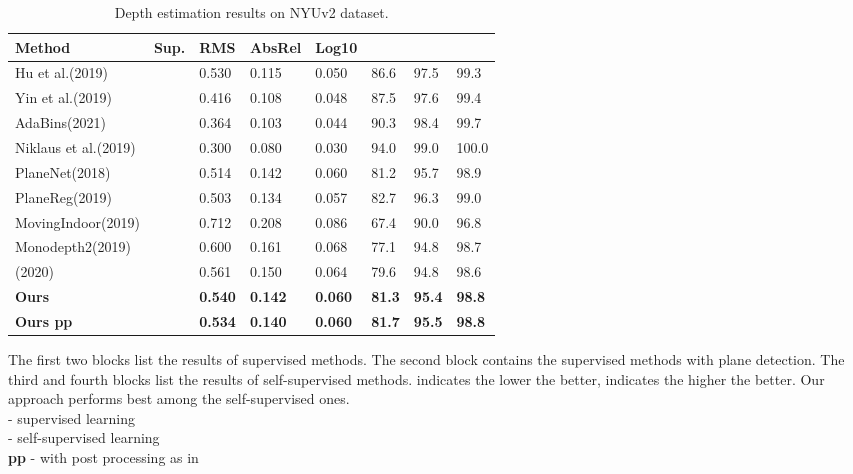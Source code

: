 \documentclass[10pt,twocolumn,letterpaper]{article}
\begin{document}
\begin{table*}[ht]
	\centering
	\begin{varwidth}[t]{\textwidth}
\vspace{0pt}
		\small
		\begin{tabularx}{0.67\textwidth}{|l|c|XXX|XXX|}
			\hline
			Method & Sup. & RMS & AbsRel & Log10 &  &  &  \\
			\hline
Hu et al.(2019)\cite{hu2019revisiting} &      & 0.530  & 0.115 & 0.050  & 86.6  & 97.5  & 99.3 \\
			Yin et al.(2019)\cite{yin2019enforcing}&      & 0.416  & 0.108 & 0.048  & 87.5  & 97.6  & 99.4 \\
			AdaBins(2021)\cite{bhat2021adabins} &         & 0.364  & 0.103 & 0.044  & 90.3  & 98.4  & 99.7 \\
			Niklaus et al.(2019)\cite{niklaus20193d} &    & 0.300  & 0.080 & 0.030  & 94.0  & 99.0  & 100.0 \\
			\hline
			PlaneNet(2018)\cite{liu2018planenet} &     & 0.514 & 0.142 & 0.060  & 81.2  & 95.7  & 98.9 \\
			PlaneReg(2019)\cite{yu2019single} &     & 0.503 & 0.134 & 0.057 & 82.7  & 96.3  & 99.0 \\
			\hline
			MovingIndoor(2019)\cite{zhou2019moving} &      & 0.712 & 0.208 & 0.086 & 67.4  & 90.0    & 96.8 \\
Monodepth2(2019)\cite{godard2019digging}   &     & 0.600 & 0.161  & 0.068 & 77.1  & 94.8  & 98.7 \\
			(2020)\cite{yu2020p} &      & 0.561 & 0.150  & 0.064 & 79.6  & 94.8  & 98.6 \\
\textbf{Ours}   &     & \textbf{0.540} & \textbf{0.142} & 
			\textbf{0.060} & \textbf{81.3}  & \textbf{95.4}  & \textbf{98.8} \\
			
\textbf{Ours  pp} &      & \textbf{0.534} & \textbf{0.140} & \textbf{0.060} & \textbf{81.7} & \textbf{95.5} & \textbf{98.8} \\
			\hline
\end{tabularx}
	\end{varwidth}
	\quad
	\begin{varwidth}[t]{\textwidth}
\vspace{0pt}
		\parbox[b]{0.30\textwidth}{
			\small
			The first two blocks list the results of supervised methods. The second block contains the supervised methods with plane detection. The third and fourth blocks list the results of self-supervised methods.  indicates the lower the better,  indicates the higher the better. Our approach performs best among the self-supervised ones.\\
			
			 - supervised learning\\
			 - self-supervised learning\\
			\textbf{pp} - with post processing as in \cite{godard2017unsupervised}\\
}
	\end{varwidth}
	\newline
	\caption{Depth estimation results on NYUv2 dataset. }
	\label{tab:nyuv2 depth}
\end{table*}
\end{document}

